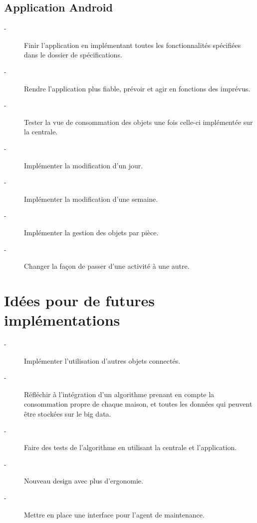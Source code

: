 \documentclass[11pt,a4paper]{report} %
\begin{document}
			
			\subsection{Application Android}

\begin{description}
	\item[-] Finir l'application en implémentant toutes les fonctionnalités spécifiées dans le dossier de spécifications. 
	\item[-] Rendre l'application plus fiable, prévoir et agir en fonctions des imprévus.
	\item[-] Tester la vue de consommation des objets une fois celle-ci implémentée sur la centrale.
	\item[-] Implémenter la modification d'un jour.
	\item[-] Implémenter la modification d'une semaine.
	\item[-] Implémenter la gestion des objets par pièce.
	\item[-] Changer la façon de passer d'une activité à une autre.
\end{description}
			
			
\newpage	
		\section{Idées pour de futures implémentations}

\begin{description}
	\item[-] Implémenter l'utilisation d'autres objets connectés.
	\item[-] Réfléchir à l'intégration d'un algorithme prenant en compte la consommation propre de chaque maison, et toutes les données qui peuvent être stockées sur le big data.
	\item[-] Faire des tests de l'algorithme en utilisant la centrale et l'application.
	\item[-] Nouveau design avec plus d'ergonomie.
	\item[-] Mettre en place une interface pour l'agent de maintenance.
\end{description}













		
\end{document}
